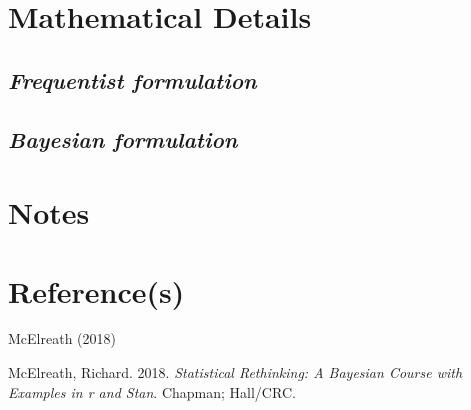\documentclass[
  letterpaper,
  DIV=11,
  numbers=noendperiod]{scrreprt}
\newenvironment{Shaded}{\begin{snugshade}}{\end{snugshade}}
\newlength{\cslhangindent}
\newenvironment{CSLReferences}[2] %
 {\begin{list}{}{%
  \setlength{\itemindent}{0pt}
  \setlength{\leftmargin}{0pt}
  \setlength{\parsep}{0pt}
  \ifodd #1
   \setlength{\leftmargin}{\cslhangindent}
   \setlength{\itemindent}{-1\cslhangindent}
  \fi
  \setlength{\itemsep}{#2\baselineskip}}}
 {\end{list}}
\begin{document}
\begin{Shaded}
\begin{Highlighting}[]

\end{Highlighting}
\end{Shaded}

\begin{Shaded}
\begin{Highlighting}[]

\end{Highlighting}
\end{Shaded}

\section{Mathematical Details}\label{mathematical-details-24}

\subsection{\texorpdfstring{\emph{Frequentist
formulation}}{Frequentist formulation}}\label{frequentist-formulation-13}

\subsection{\texorpdfstring{\emph{Bayesian
formulation}}{Bayesian formulation}}\label{bayesian-formulation-13}

\section{Notes}\label{notes-15}

\begin{tcolorbox}[enhanced jigsaw, toptitle=1mm, opacityback=0, titlerule=0mm, breakable, bottomrule=.15mm, colframe=quarto-callout-note-color-frame, arc=.35mm, coltitle=black, left=2mm, opacitybacktitle=0.6, leftrule=.75mm, toprule=.15mm, rightrule=.15mm, bottomtitle=1mm, colbacktitle=quarto-callout-note-color!10!white, title=\textcolor{quarto-callout-note-color}{\faInfo}\hspace{0.5em}{Note}, colback=white]

\end{tcolorbox}

\section{Reference(s)}\label{references-19}

McElreath (2018)

\label{refs}
\begin{CSLReferences}{1}{0}
McElreath, Richard. 2018. \emph{Statistical Rethinking: A Bayesian
Course with Examples in r and Stan}. Chapman; Hall/CRC.

\end{CSLReferences}
\end{document}
